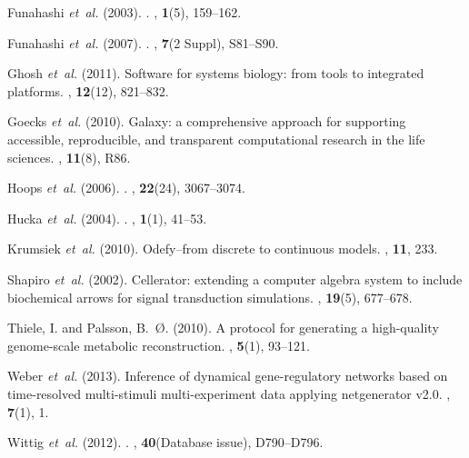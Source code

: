 \documentclass{bioinfo}
\begin{document}
\begin{thebibliography}{}
Funahashi {\em et~al.} (2003).
.
, {\bf 1}(5), 159--162.

Funahashi {\em et~al.} (2007).
.
, {\bf 7}(2 Suppl), S81--S90.

Ghosh {\em et~al.} (2011).
\newblock Software for systems biology: from tools to integrated platforms.
, {\bf 12}(12), 821--832.

Goecks {\em et~al.} (2010).
\newblock Galaxy: a comprehensive approach for supporting accessible,
  reproducible, and transparent computational research in the life sciences.
, {\bf 11}(8), R86.

Hoops {\em et~al.} (2006).
.
, {\bf 22}(24), 3067--3074.

Hucka {\em et~al.} (2004).
.
, {\bf 1}(1), 41--53.

Krumsiek {\em et~al.} (2010).
\newblock Odefy--from discrete to continuous models.
, {\bf 11}, 233.

Shapiro {\em et~al.} (2002).
\newblock Cellerator: extending a computer algebra system to include
  biochemical arrows for signal transduction simulations.
, {\bf 19}(5), 677--678.

Thiele, I. and Palsson, B.~{\O}. (2010).
\newblock A protocol for generating a high-quality genome-scale metabolic
  reconstruction.
, {\bf 5}(1), 93--121.

Weber {\em et~al.} (2013).
\newblock Inference of dynamical gene-regulatory networks based on
  time-resolved multi-stimuli multi-experiment data applying netgenerator v2.0.
, {\bf 7}(1), 1.

Wittig {\em et~al.} (2012).
.
, {\bf 40}(Database issue), D790--D796.

\end{thebibliography}
\end{document}

